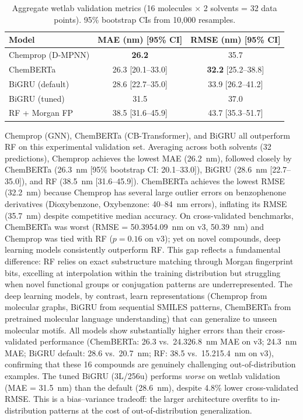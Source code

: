 \documentclass[journal=jcisd8,manuscript=article]{achemso}
\newcommand{\added}[1]{{\color{addedblue}#1}}
\newcommand{\removed}[1]{{\color{removedred}#1}}
\begin{document}
\begin{table}[htbp]
\centering
\caption{Aggregate wetlab validation metrics (16 molecules $\times$ 2 solvents = 32 data points). 95\% bootstrap CIs from 10,000 resamples.}
\label{tab:wetlab_summary}
\begin{tabular}{lcc}
\toprule
\textbf{Model} & \textbf{MAE (nm) [95\% CI]} & \textbf{RMSE (nm) [95\% CI]} \\
\midrule
Chemprop (D-MPNN) & \textbf{26.2} & 35.7 \\
ChemBERTa & 26.3 [20.1--33.0] & \textbf{32.2} [25.2--38.8] \\
BiGRU (default) & 28.6 [22.7--35.0] & 33.9 [26.2--41.2] \\
BiGRU (tuned) & 31.5 & 37.0 \\
RF + Morgan FP & 38.5 [31.6--45.9] & 43.7 [35.3--51.7] \\
\bottomrule
\end{tabular}
\end{table}

Chemprop (GNN), ChemBERTa (CB-Transformer), and BiGRU all outperform RF on this experimental validation set. Averaging across both solvents (32 predictions), Chemprop achieves the lowest MAE (26.2~nm), followed closely by ChemBERTa (26.3~nm [95\% bootstrap CI: 20.1--33.0]), BiGRU (28.6~nm [22.7--35.0]), and RF (38.5~nm [31.6--45.9]).
ChemBERTa achieves the lowest RMSE (32.2~nm) because Chemprop has several large outlier errors on benzophenone derivatives (Dioxybenzone, Oxybenzone: 40--84~nm errors), inflating its RMSE (35.7~nm) despite competitive median accuracy.
On cross-validated benchmarks, ChemBERTa was worst (RMSE = \removed{50.39}\added{54.09~nm on v3, 50.39}~nm) and Chemprop was tied with RF\added{ ($p = 0.16$ on v3)}; yet on novel compounds, deep learning models consistently outperform RF.
This gap reflects a fundamental difference: RF relies on exact substructure matching through Morgan fingerprint bits, excelling at interpolation within the training distribution but struggling when novel functional groups or conjugation patterns are underrepresented.
The deep learning models, by contrast, learn representations (Chemprop from molecular graphs, BiGRU from sequential SMILES patterns, ChemBERTa from pretrained molecular language understanding) that can generalize to unseen molecular motifs.
All models show substantially higher errors than their cross-validated performance (ChemBERTa: 26.3 vs.\ \removed{24.3}\added{26.8~nm MAE on v3; 24.3}~nm MAE; BiGRU default: 28.6 vs.\ 20.7~nm; RF: 38.5 vs.\ \removed{15.2}\added{15.4}~nm \added{on v3}), confirming that these 16 compounds are genuinely challenging out-of-distribution examples.
The tuned BiGRU (3L/256u) performs \textit{worse} on wetlab validation (MAE = 31.5~nm) than the default (28.6~nm), despite 4.8\% lower cross-validated RMSE. This is a bias--variance tradeoff: the larger architecture overfits to in-distribution patterns at the cost of out-of-distribution generalization.
\end{document}
